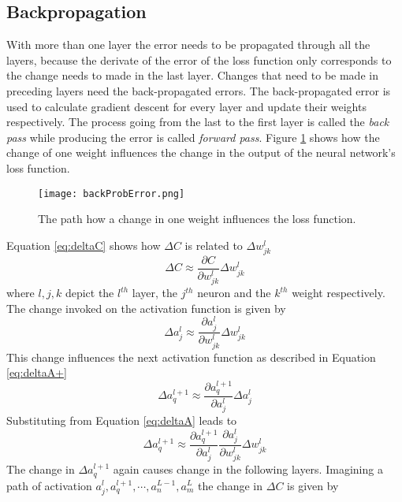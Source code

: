 \subsection{Backpropagation}\label{ssec:backProp}
With more than one layer the error needs to be propagated through all the layers, because the derivate of the error of the loss function only corresponds to the change needs to made in the last layer.
Changes that need to be made in preceding layers need the back-propagated errors. The back-propagated error is used to calculate gradient descent for every layer and update their weights respectively.
The process going from the last to the first layer is called the \emph{back pass} while producing the error is called \emph{forward pass}. 
Figure \ref{fig:backProbError} shows how the change of one weight influences the change in the output of the neural network's loss function.
\begin{figure}
\centering
  \texttt{[image: backProbError.png]}
  \caption{The path how a change in one weight influences the loss function.\cite{Nielsen2015}
}\label{fig:backProbError}
\end{figure}
Equation \ref{eq:deltaC} shows how $\Delta C$ is related to $\Delta w^l_{jk}$
\begin{equation}\label{eq:deltaC}
\Delta C \approx \frac{\partial C}{\partial w^l_{jk}} \Delta w^l_{jk}
\end{equation}
where $l, j, k$ depict the $l^{th}$ layer, the $j^{th}$ neuron and the $k^{th}$ weight respectively.
The change invoked on the activation function is given by
\begin{equation}\label{eq:deltaA}
\Delta a^l_j \approx \frac{\partial a^l_j}{\partial w^l_{jk}} \Delta w^l_{jk}
\end{equation}
This change influences the next activation function as described in Equation \ref{eq:deltaA+}
\begin{equation}\label{eq:deltaA+}
\Delta a^{l+1}_q \approx \frac{\partial a^{l+1}_q }{\partial  a^l_j} \Delta  a^l_j
\end{equation}
Substituting from Equation \ref{eq:deltaA} leads to 
\begin{equation}\label{eq:deltaA++}
\Delta a^{l+1}_q \approx \frac{\partial a^{l+1}_q }{\partial  a^l_j}\frac{\partial a^l_j}{\partial w^l_{jk}} \Delta w^l_{jk} 
\end{equation}
The change in $\Delta a^{l+1}_q $ again causes change in the following layers. 
Imagining a path of activation $ a^l_j ,  a^{l+1}_q, \cdots, a^{L-1}_n, a^{L}_m$ the change in $\Delta C$ is given by
